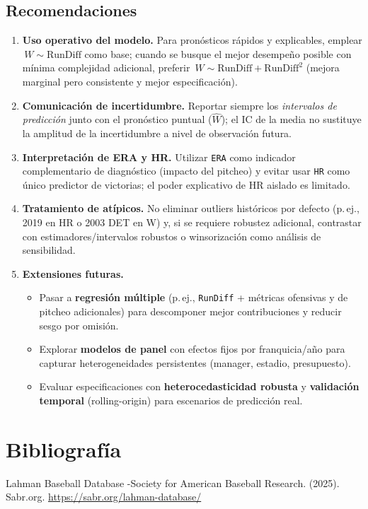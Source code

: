 \documentclass[10pt]{article}
\begin{document}
\subsection{Recomendaciones}
\begin{enumerate}
    \item \textbf{Uso operativo del modelo.} Para pronósticos rápidos y explicables, emplear \(\,W \sim \text{RunDiff}\) como base; cuando se busque el mejor desempeño posible con mínima complejidad adicional, preferir \(\,W \sim \text{RunDiff} + \text{RunDiff}^2\) (mejora marginal pero consistente y mejor especificación).
    \item \textbf{Comunicación de incertidumbre.} Reportar siempre los \textit{intervalos de predicción} junto con el pronóstico puntual (\(\hat{W}\)); el IC de la media no sustituye la amplitud de la incertidumbre a nivel de observación futura.
    \item \textbf{Interpretación de ERA y HR.} Utilizar \texttt{ERA} como indicador complementario de diagnóstico (impacto del pitcheo) y evitar usar \texttt{HR} como único predictor de victorias; el poder explicativo de HR aislado es limitado.
    \item \textbf{Tratamiento de atípicos.} No eliminar outliers históricos por defecto (p.\,ej., 2019 en HR o 2003 DET en W) y, si se requiere robustez adicional, contrastar con estimadores/intervalos robustos o winsorización como análisis de sensibilidad.
    \item \textbf{Extensiones futuras.} 
    \begin{itemize}
        \item Pasar a \textbf{regresión múltiple} (p.\,ej., \texttt{RunDiff} + métricas ofensivas y de pitcheo adicionales) para descomponer mejor contribuciones y reducir sesgo por omisión.
        \item Explorar \textbf{modelos de panel} con efectos fijos por franquicia/año para capturar heterogeneidades persistentes (manager, estadio, presupuesto).
        \item Evaluar especificaciones con \textbf{heterocedasticidad robusta} y \textbf{validación temporal} (rolling-origin) para escenarios de predicción real.
    \end{itemize}
\end{enumerate}
\section{Bibliografía}
Lahman Baseball Database -Society for American Baseball Research. (2025). Sabr.org. \url{https://sabr.org/lahman-database/}
\end{document}
